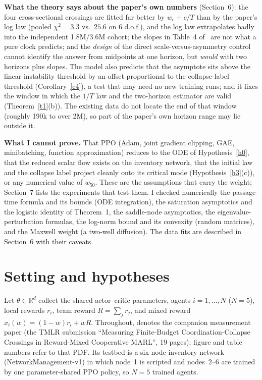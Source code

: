 \documentclass[11pt]{article}
\theoremstyle{definition}
\theoremstyle{remark}
\newcommand{\R}{\mathbb{R}}
\newcommand{\wcrit}{w_{\mathrm c}}
\newcommand{\wfifty}{w_{50}}
\begin{document}
\textbf{What the theory says about the paper's own numbers} (Section~6): the four cross-sectional crossings are fitted far better by $\wcrit+c/T$ than by the paper's log law (pooled $\chi^2=3.3$ vs.\ $25.6$ on 6 d.o.f.), and the log law extrapolates badly into the independent 1.8M/3.6M cohort; the slopes in Table~4 of~\cite{P} are not what a pure clock predicts; and the \emph{design} of the direct scale-versus-asymmetry control cannot identify the answer from midpoints at one horizon, but \emph{would} with two horizons plus slopes. The model also predicts that the asymptote sits above the linear-instability threshold by an offset proportional to the collapse-label threshold (Corollary~\ref{c4}), a test that may need no new training runs; and it fixes the window in which the $1/T$ law and the two-horizon estimator are valid (Theorem~\ref{t1}(b)). The existing data do not locate the end of that window (roughly 190k to over 2M), so part of the paper's own horizon range may lie outside it.

\textbf{What I cannot prove.} That PPO (Adam, joint gradient clipping, GAE, minibatching, function approximation) reduces to the ODE of Hypothesis~\ref{h0}, that the reduced scalar flow exists on the inventory network, that the initial law and the collapse label project cleanly onto its critical mode (Hypothesis~\ref{h3}(c)), or any numerical value of $\wfifty$. These are the assumptions that carry the weight; Section~7 lists the experiments that test them. I checked numerically the passage-time formula and its bounds (ODE integration), the saturation asymptotics and the logistic identity of Theorem~1, the saddle-node asymptotics, the eigenvalue-perturbation formulas, the log-norm bound and its convexity (random matrices), and the Maxwell weight (a two-well diffusion). The data fits are described in Section~6 with their caveats.

\section{Setting and hypotheses}

Let $\theta\in\R^d$ collect the shared actor--critic parameters, agents $i=1,\dots,N$ ($N=5$), local rewards $r_i$, team reward $R=\sum_j r_j$, and mixed reward $x_i(w)=(1-w)r_i+wR$. Throughout, \cite{P} denotes the companion measurement paper (the TMLR submission ``Measuring Finite-Budget Coordination-Collapse Crossings in Reward-Mixed Cooperative MARL'', 19 pages); figure and table numbers refer to that PDF. Its testbed is a six-node inventory network (NetworkManagement-v1) in which node~1 is scripted and nodes~2--6 are trained by one parameter-shared PPO policy, so $N=5$ trained agents.
\end{document}
